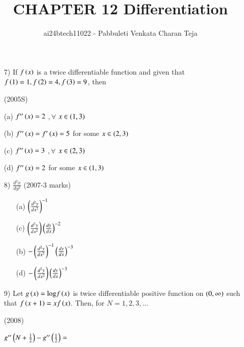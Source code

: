 \documentclass[journal,12pt,twocolumn]{IEEEtran}
\theoremstyle{remark}
\begin{document}

\vspace{3cm}

\title{CHAPTER 12 Differentiation}
\author{ai24btech11022 - Pabbuleti Venkata Charan Teja}

\begin{enumerate}
\item[7)]
If $f\left(x\right)$ is a twice differentiable function and given that $f\left(1\right)=1,f\left(2\right)=4,f\left(3\right)=9$, then 

\hfill{(2005S)}

(a) $f^{\prime\prime}\left(x\right)=2$ $,\forall$ $x\in\left(1,3\right)$

(b) $f^{\prime\prime}\left(x\right)=f^{\prime}\left(x\right)=5$ for some $x\in\left(2,3\right)$

(c) $f^{\prime\prime}\left(x\right)=3$ $,\forall$ $x\in\left(2,3\right)$

(d) $f^{\prime\prime}\left(x\right)=2$ for some $x\in\left(1,3\right)$

\item[8)]
$\frac{d^{2}x}{dy^{2}}$ \hfill{(2007-3 marks)}

\begin{multicols}{2}
\begin{enumerate}
\item[(a)]$\left(\frac{d^{2}y}{dx^{2}}\right)^{-1}$
\item[(c)]$\left(\frac{d^{2}y}{dx^{2}}\right)\left(\frac{dy}{dx}\right)^{-2}$
\item[(b)]$-\left(\frac{d^{2}y}{dx^{2}}\right)^{-1}\left(\frac{dy}{dx}\right)^{-3}$
\item[(d)]$-\left(\frac{d^{2}y}{dx^{2}}\right)\left(\frac{dy}{dx}\right)^{-3}$
\end{enumerate}    
\end{multicols}

\item[9)]
Let $g\left(x\right)=\text{log}f\left(x\right)$ is twice differentiable positive function on $\left(0,\infty\right)$ such that ${f\left(x+1\right)=xf\left(x\right)}$. Then, for $N=1,2,3,\dots$ 

\hfill{(2008)}

$g^{\prime\prime}\left(N+\frac{1}{2}\right)-g^{\prime\prime}\left(\frac{1}{2}\right)=$


\end{enumerate}
\end{document}
